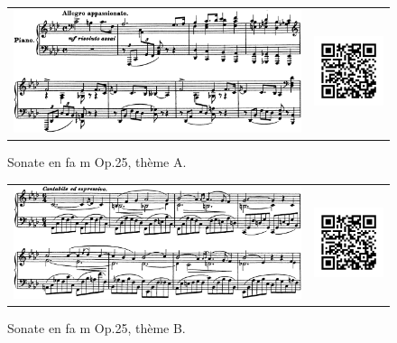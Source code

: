 \begin{figure}[!ht]
  \begin{bigcenter}
    \begin{tabular}{lr}
      \includegraphics[width=12.5cm, keepaspectratio]{sonate-theme-A.png}
      &
      \includegraphics[width=3cm, keepaspectratio]{op1-qr.png}
    \end{tabular}
  \end{bigcenter}
  \caption{\label{sonate-theme-1}Sonate en fa m Op.25, thème A.}
\end{figure}

\begin{figure}[!ht]
  \begin{bigcenter}
    \begin{tabular}{lr}
      \includegraphics[width=12.5cm, keepaspectratio]{sonate-theme-B.png}
      &
      \includegraphics[width=3cm, keepaspectratio]{op1-qr.png}
    \end{tabular}
  \end{bigcenter}
  \caption{\label{sonate-theme-2}Sonate en fa m Op.25, thème B.}
\end{figure}

